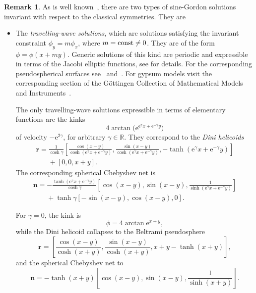 \documentclass[pdftex]{sigma}
\let\ve\mathbf
\def\RR{{\mathbb R}}
\numberwithin{equation}{section}
\theoremstyle{definition}
\newtheorem{Remark}[Theorem]{Remark}
\begin{document}
\begin{Remark}\label{rem:sG:inv}
As is well known~\cite{P-M-2007},
there are two types of sine-Gordon solutions invariant
with respect to the classical symmetries.
They are
\begin{itemize}\itemsep=0pt
\item[(1)] The {\it travelling-wave solutions}, which are
solutions satisfying the invariant con\-straint $\phi_y = m \phi_x$,
where $m = {\rm const} \ne 0$.
They are of the form $\phi = \phi(x + m y)$.
Generic solutions of this kind are periodic and expressible in terms
of the Jacobi elliptic functions,
see \cite[Section~2.5.1]{P-M-2007} for details.
For the corresponding pseudospherical surfaces see~\cite{Z-1994}
and~\cite[Section~3.7.1]{P-M-2007}.
For gypsum models visit the corresponding section of the
G\"ottingen Collection of Mathematical Models and
Instruments~\cite[Section~E.V]{sammlung}.


The only travelling-wave solutions expressible in terms of elementary
functions are the kinks
\begin{equation}
\label{eq:Dini:phi}
4 \arctan\bigl(\mathrm{e}^{\mathrm{e}^\gamma x + \mathrm{e}^{-\gamma} y}\bigr)
\end{equation}
of velocity $-\mathrm{e}^{2\gamma}$, for arbitrary $\gamma \in \RR$.
They correspond to the {\it Dini helicoids}
\begin{gather}
\ve r = \frac1{\cosh\gamma}
\left[\frac{\cos(x - y)}{\cosh(\mathrm{e}^\gamma x + \mathrm{e}^{-\gamma} y)},
 \frac{\sin(x - y)}{\cosh(\mathrm{e}^\gamma x + \mathrm{e}^{-\gamma} y)},\nonumber
 -{\tanh}(\mathrm{e}^\gamma x + \mathrm{e}^{-\gamma} y)\right]
\\
\phantom{\ve r =}{} +
[0, 0, x + y].\label{eq:Dini:r}
\end{gather}
The corresponding spherical Chebyshev net is
\begin{gather*}
\ve n = -\frac{\tanh(\mathrm{e}^\gamma x + \mathrm{e}^{-\gamma} y)}{\cosh \gamma}
 \left[\cos(x - y), \sin(x - y),
 \frac{1}{\sinh(\mathrm{e}^\gamma x + \mathrm{e}^{-\gamma} y)}\right]
\\ \phantom{\ve n =}{} +
\tanh \gamma \left[-\sin(x - y), \cos(x - y), 0\right].
\end{gather*}

For $\gamma = 0$, the kink is
\begin{equation}
\label{eq:PS:phi}
\phi = 4\arctan \mathrm{e}^{x + y},
\end{equation}
while the Dini helicoid collapses to the Beltrami pseudosphere
\begin{equation}
\label{eq:PS:r}
\ve r =
\left[\frac{\cos(x - y)}{\cosh(x + y)}, \frac{\sin(x - y)}{\cosh(x + y)},
 x + y - \tanh(x + y)\right],
\end{equation}
and the spherical Chebyshev net to
\begin{equation}
\label{eq:PS:n}
\ve n =
-{\tanh}(x + y)
 \left[\cos(x - y), \sin(x - y), \frac{1}{\sinh(x + y)}\right].
\end{equation}


\end{itemize}
\end{Remark}
\end{document}
